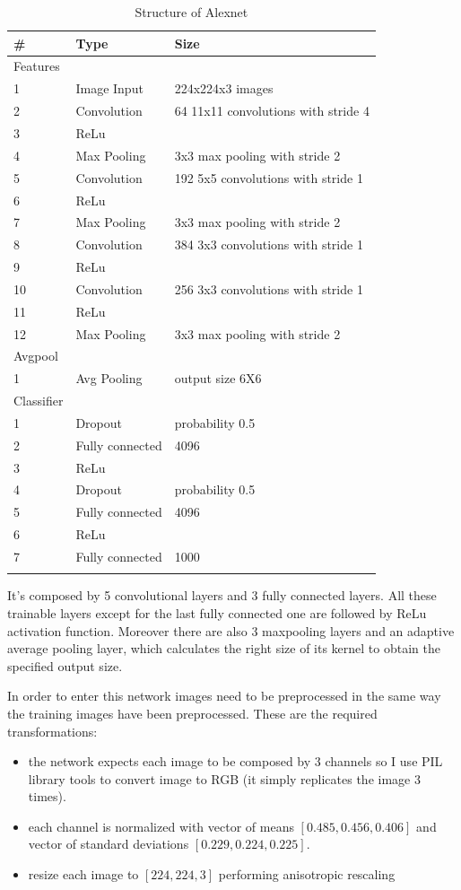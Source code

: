 \documentclass[12pt, a4paper]{report}
\begin{document}
\begin{table}[h!]
	\centering
	\caption{Structure of Alexnet}
	\begin{tabular}{lll}
		\# & Type & Size \\
		\midrule
		Features & & \\
		1 & Image Input & 224x224x3 images \\
		2 & Convolution & 64 11x11 convolutions with stride 4 \\
		3 & ReLu & \\
		4 & Max Pooling & 3x3 max pooling with stride 2 \\
		5 & Convolution & 192 5x5 convolutions with stride 1 \\
		6 & ReLu & \\
		7 & Max Pooling & 3x3 max pooling with stride 2 \\
		8 & Convolution & 384 3x3 convolutions with stride 1 \\
		9 & ReLu & \\
		10 & Convolution & 256 3x3 convolutions with stride 1 \\
		11 & ReLu & \\
		12 & Max Pooling & 3x3 max pooling with stride 2 \\
		\midrule
		Avgpool & & \\
		1 & Avg Pooling & output size 6X6\\
		\midrule
		Classifier & & \\
		1 & Dropout & probability 0.5 \\
		2 & Fully connected & 4096 \\
		3 & ReLu & \\
		4 & Dropout & probability 0.5 \\
		5 & Fully connected & 4096 \\
		6 & ReLu & \\
		7 & Fully connected & 1000 \\
		\bottomrule
		\label{tab:alexnet}
	\end{tabular}
\end{table}

It's composed by 5 convolutional layers and 3 fully connected layers. All these trainable layers except for the last fully connected one are followed by ReLu activation function. Moreover there are also 3 maxpooling layers and an adaptive average pooling layer, which calculates the right size of its kernel to obtain the specified output size.

In order to enter this network images need to be preprocessed in the same way the training images have been preprocessed. These are the required transformations:
\begin{itemize}
	\item the network expects each image to be composed by 3 channels so I use PIL library tools to convert image to RGB (it simply replicates the image 3 times).
	\item each channel is normalized with vector of means $[0.485, 0.456, 0.406]$ and vector of standard deviations $[0.229, 0.224, 0.225]$.
	\item resize each image to $[224,224,3]$ performing anisotropic rescaling
\end{itemize}
\end{document}
